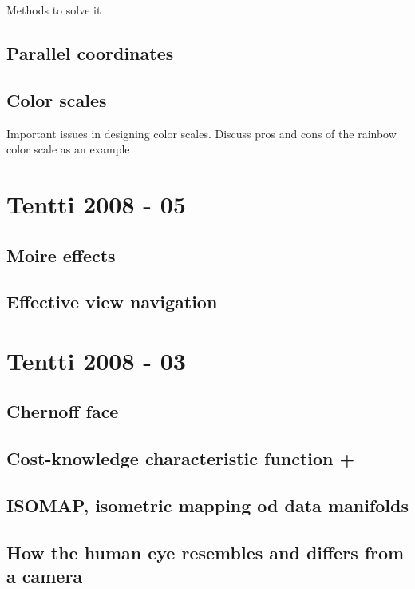 \documentclass[a4paper]{article}
\begin{document}
Methods to solve it

\subsection{Parallel coordinates}

\subsection{Color scales}

Important issues in designing color scales. Discuss pros and cons of the rainbow color scale as an example

\section{Tentti 2008 - 05}

\subsection{Moire effects}

\subsection{Effective view navigation}

\section{Tentti 2008 - 03}

\subsection{Chernoff face}

\subsection{Cost-knowledge characteristic function +}

\subsection{ISOMAP, isometric mapping od data manifolds}

\subsection{How the human eye resembles and differs from a camera}
\end{document}
